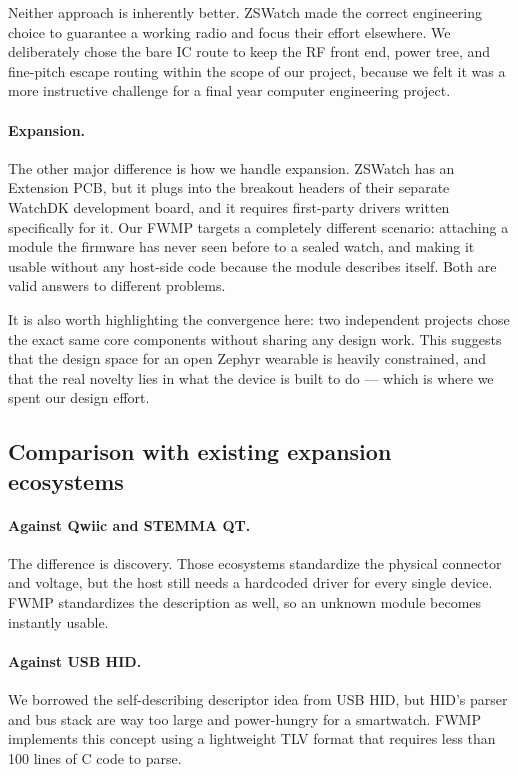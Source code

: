 \documentclass[12pt, a4paper]{article}
\begin{document}
Neither approach is inherently better. ZSWatch made the correct engineering choice to guarantee a working radio and focus their effort elsewhere. We deliberately chose the bare IC route to keep the RF front end, power tree, and fine-pitch escape routing within the scope of our project, because we felt it was a more instructive challenge for a final year computer engineering project.

\paragraph{Expansion.} The other major difference is how we handle expansion. ZSWatch has an Extension PCB, but it plugs into the breakout headers of their separate WatchDK development board, and it requires first-party drivers written specifically for it. Our FWMP targets a completely different scenario: attaching a module the firmware has never seen before to a sealed watch, and making it usable without any host-side code because the module describes itself. Both are valid answers to different problems.

It is also worth highlighting the convergence here: two independent projects chose the exact same core components without sharing any design work. This suggests that the design space for an open Zephyr wearable is heavily constrained, and that the real novelty lies in what the device is built to do --- which is where we spent our design effort.

\subsection{Comparison with existing expansion ecosystems}

\paragraph{Against Qwiic and STEMMA QT.} The difference is discovery. Those ecosystems standardize the physical connector and voltage, but the host still needs a hardcoded driver for every single device. FWMP standardizes the description as well, so an unknown module becomes instantly usable.

\paragraph{Against USB HID.} We borrowed the self-describing descriptor idea from USB HID, but HID's parser and bus stack are way too large and power-hungry for a smartwatch. FWMP implements this concept using a lightweight TLV format that requires less than 100 lines of C code to parse.
\end{document}
